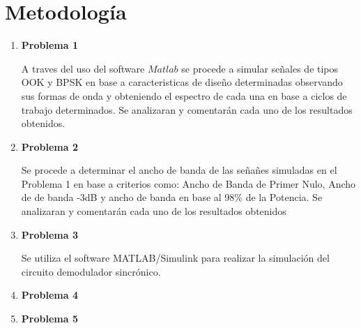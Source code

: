 \documentclass[letterpaper, titlepage]{article}
\begin{document}
\section{Metodología}
	\begin{enumerate}
		\item \textbf{Problema 1}
		
		A traves del uso del software $Matlab$ se procede a simular señales de tipos OOK y BPSK en base a caracteristicas de diseño determinadas observando sus formas de onda y obteniendo el espectro de cada una en base a ciclos de trabajo determinados. Se  analizaran y comentarán cada uno de  los resultados obtenidos.
		\item \textbf{Problema 2}
		
		Se procede a determinar el ancho de banda de las señañes simuladas en el Problema 1 en base a criterios como: Ancho de Banda de Primer Nulo, Ancho de de banda -3dB y ancho de banda en base al 98\% de la Potencia. Se  analizaran y comentarán cada uno de  los resultados obtenidos
		\item \textbf{Problema 3}
		
			Se utiliza el software MATLAB/Simulink para realizar la simulación del circuito demodulador sincrónico.
		\item \textbf{Problema 4}
		
		\item \textbf{Problema 5}
	\end{enumerate}
\newpage
\newpage
\end{document}

